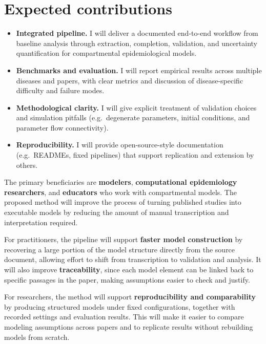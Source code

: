 \documentclass[a4paper,12pt]{article}
\begin{document}
\section{Expected contributions}

\begin{itemize}[leftmargin=*]
  \item \textbf{Integrated pipeline.} I will deliver a documented end-to-end workflow from baseline analysis through extraction, completion, validation, and uncertainty quantification for compartmental epidemiological models.
  \item \textbf{Benchmarks and evaluation.} I will report empirical results across multiple diseases and papers, with clear metrics and discussion of disease-specific difficulty and failure modes.
  \item \textbf{Methodological clarity.} I will give explicit treatment of validation choices and simulation pitfalls (e.g.\ degenerate parameters, initial conditions, and parameter flow connectivity).
  \item \textbf{Reproducibility.} I will provide open-source-style documentation (e.g.\ READMEs, fixed pipelines) that support replication and extension by others.
\end{itemize}

The primary beneficiaries are \textbf{modelers}, \textbf{computational epidemiology researchers}, and \textbf{educators} who work with compartmental models. The proposed method will improve the process of turning published studies into executable models by reducing the amount of manual transcription and interpretation required.

For practitioners, the pipeline will support \textbf{faster model construction} by recovering a large portion of the model structure directly from the source document, allowing effort to shift from transcription to validation and analysis. It will also improve \textbf{traceability}, since each model element can be linked back to specific passages in the paper, making assumptions easier to check and justify.

For researchers, the method will support \textbf{reproducibility and comparability} by producing structured models under fixed configurations, together with recorded settings and evaluation results. This will make it easier to compare modeling assumptions across papers and to replicate results without rebuilding models from scratch.
\end{document}
